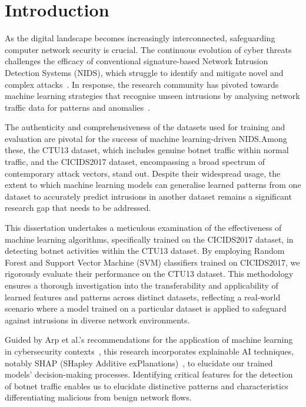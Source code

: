 \chapter{Introduction}\label{chap:introduction}

As the digital landscape becomes increasingly interconnected, safeguarding computer network security is crucial. The continuous evolution of cyber threats challenges the efficacy of conventional signature-based Network Intrusion Detection Systems (NIDS), which struggle to identify and mitigate novel and complex attacks~\cite{marchetti2016analysis}. In response, the research community has pivoted towards machine learning strategies that recognise unseen intrusions by analysing network traffic data for patterns and anomalies~\cite{buczak2015survey}.

The authenticity and comprehensiveness of the datasets used for training and evaluation are pivotal for the success of machine learning-driven NIDS.\@ Among these, the CTU13 dataset, which includes genuine botnet traffic within normal traffic, and the CICIDS2017 dataset, encompassing a broad spectrum of contemporary attack vectors, stand out. Despite their widespread usage, the extent to which machine learning models can generalise learned patterns from one dataset to accurately predict intrusions in another dataset remains a significant research gap that needs to be addressed.

This dissertation undertakes a meticulous examination of the effectiveness of machine learning algorithms, specifically trained on the CICIDS2017 dataset, in detecting botnet activities within the CTU13 dataset. By employing Random Forest and Support Vector Machine (SVM) classifiers trained on CICIDS2017, we rigorously evaluate their performance on the CTU13 dataset. This methodology ensures a thorough investigation into the transferability and applicability of learned features and patterns across distinct datasets, reflecting a real-world scenario where a model trained on a particular dataset is applied to safeguard against intrusions in diverse network environments.

Guided by Arp et al.’s recommendations for the application of machine learning in cybersecurity contexts~\cite{arp2022and}, this research incorporates explainable AI techniques, notably SHAP (SHapley Additive exPlanations)~\cite{lundberg2017unified}, to elucidate our trained models’ decision-making processes. Identifying critical features for the detection of botnet traffic enables us to elucidate distinctive patterns and characteristics differentiating malicious from benign network flows.

